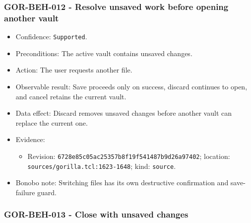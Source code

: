 \documentclass[
  letterpaper,
]{article}
\newcommand{\passthrough}[1]{#1}
\providecommand{\tightlist}{%
  \setlength{\itemsep}{0pt}\setlength{\parskip}{0pt}}
\begin{document}
\subsubsection{GOR-BEH-012 - Resolve unsaved work before opening another
vault}\label{gor-beh-012---resolve-unsaved-work-before-opening-another-vault}

\begin{itemize}
\tightlist
\item
  Confidence: \passthrough{\lstinline!Supported!}.
\item
  Preconditions: The active vault contains unsaved changes.
\item
  Action: The user requests another file.
\item
  Observable result: Save proceeds only on success, discard continues to open, and cancel retains the current vault.
\item
  Data effect: Discard removes unsaved changes before another vault can replace the current one.
\item
  Evidence:

  \begin{itemize}
  \tightlist
  \item
    Revision: \nolinkurl{6728e85c05ac25357b8f19f541487b9d26a97402}; location: \nolinkurl{sources/gorilla.tcl:1623-1648};
    kind: \passthrough{\lstinline!source!}.
  \end{itemize}
\item
  Bonobo note: Switching files has its own destructive confirmation and save-failure guard.
\end{itemize}

\subsubsection{GOR-BEH-013 - Close with unsaved changes}\label{gor-beh-013---close-with-unsaved-changes}
\end{document}
